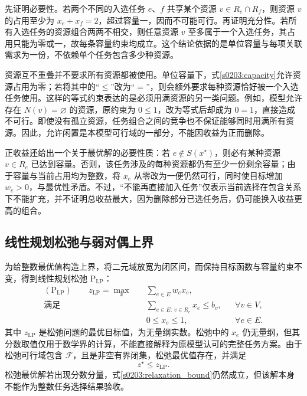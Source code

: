 先证明必要性。若两个不同的入选任务 $e$、$f$ 共享某个资源 $v\in R_e\cap R_f$，则资源 $v$ 的占用至少为 $x_e+x_f=2$，超过容量一，因而不可能可行。再证明充分性。若所有入选任务的资源组合两两不相交，则任意资源 $v$ 至多属于一个入选任务，其占用只能为零或一，故每条容量约束均成立。这个结论依据的是单位容量与每项关联需求为一份，不依赖单个任务包含多少种资源。

资源互不重叠并不要求所有资源都被使用。单位容量下，式\eqref{s0203:capacity}允许资源占用为零；若将其中的“$\leq$”改为“$=$”，则会额外要求每种资源恰好被一个入选任务使用。这样的等式约束表达的是必须用满资源的另一类问题。例如，模型允许存在 $N(v)=\varnothing$ 的资源，原约束为 $0\leq1$，改为等式后却成为 $0=1$，直接造成不可行。即使没有孤立资源，任务组合之间的竞争也不保证能够同时用满所有资源。因此，允许闲置是本模型可行域的一部分，不能因收益为正而删除。

正收益还给出一个关于最优解的必要性质：若 $e\notin S(x^\star)$，则必有某种资源 $v\in R_e$ 已达到容量。否则，该任务涉及的每种资源都仍有至少一份剩余容量；由于容量与当前占用均为整数，将 $x_e$ 从零改为一便仍然可行，同时使目标增加 $w_e>0$，与最优性矛盾。不过，“不能再直接加入任务”仅表示当前选择在包含关系下不能扩充，并不证明总收益最大，因为删除部分已选任务后，仍可能换入收益更高的组合。

\subsection{线性规划松弛与弱对偶上界}

为给整数最优值构造上界，将二元域放宽为闭区间，而保持目标函数与容量约束不变，得到线性规划松弛 $\mathrm P_{\mathrm{LP}}$：
\begin{subequations}
\label{s0203:lp}
\begin{align}
 (\mathrm P_{\mathrm{LP}})\qquad
 z_{\mathrm{LP}}=\max_x\quad
 &\sum_{e\in E}w_e x_e,
 \label{s0203:lp_objective}\\
 \text{满足}\quad
 &\sum_{e\in E:\,v\in R_e}x_e\leq b_v,
 &&\forall v\in V,
 \label{s0203:lp_capacity}\\
 &0\leq x_e\leq1,
 &&\forall e\in E.
 \label{s0203:lp_domain}
\end{align}
\end{subequations}
其中 $z_{\mathrm{LP}}$ 是松弛问题的最优目标值，为无量纲实数。松弛中的 $x_e$ 仍无量纲，但其分数取值仅用于数学界的计算，不能直接解释为原模型认可的完整任务方案。由于松弛可行域包含 $\mathcal F$，且是非空有界闭集，松弛最优值存在，并满足
\begin{equation}
 z^\star\leq z_{\mathrm{LP}}.
 \label{s0203:relaxation_bound}
\end{equation}
松弛最优解若出现分数分量，式\eqref{s0203:relaxation_bound}仍然成立，但该解本身不能作为整数任务选择结果验收。

